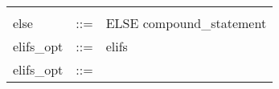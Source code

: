 \begin{longtable}{lrl}
\begin{minipage}[t]{\rulerhs}
  \end{minipage}                                                             \\
else                                       & ::= &
  \begin{minipage}[t]{\rulerhs}
    \raggedright
    ELSE compound\_statement
  \end{minipage}                                                             \\
elifs\_opt                                 & ::= &
  \begin{minipage}[t]{\rulerhs}
    \raggedright
    elifs
  \end{minipage}                                                             \\
elifs\_opt                                 & ::= &
  \begin{minipage}[t]{\rulerhs}
    \raggedright
    

\end{minipage}
\end{longtable}

